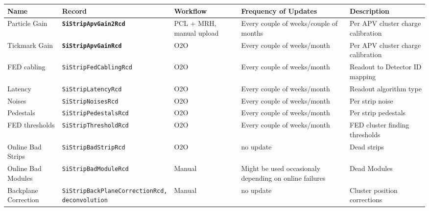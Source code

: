 \begin{table}[h!]
    \centering
    \begin{adjustbox}{max width=\textwidth}
    \begin{tabular}{p{3.4cm}|p{4.6cm}|p{2.5cm}|p{2.5cm}|p{3.5cm}}
        \textbf{Name} & \textbf{Record} & \textbf{Workflow} & \textbf{Frequency of Updates} & \textbf{Description} \\ \hline
      Particle Gain              & \texttt{\textbf{SiStripApvGain2Rcd}}             &   PCL + MRH, manual upload              & Every couple of weeks/couple of months  & Per APV cluster charge calibration  \\ \hline
      Tickmark Gain              & \texttt{\textbf{SiStripApvGainRcd}}              &   O2O                                   & Every couple of weeks/month             & Per APV cluster charge calibration  \\ \hline
      FED cabling                & \texttt{SiStripFedCablingRcd}           &   O2O                                   & Every couple of weeks/month             & Readout to Detector ID mapping  \\ \hline
      Latency                    & \texttt{SiStripLatencyRcd}              &   O2O                                   & Every couple of weeks/month             & Readout algorithm type  \\ \hline     
      Noises                     & \texttt{SiStripNoisesRcd}               &   O2O                                   & Every couple of weeks/month             & Per strip noise  \\ \hline
      Pedestals                  & \texttt{SiStripPedestalsRcd}            &   O2O                                   & Every couple of weeks/month             & Per strip pedestals  \\ \hline
      FED thresholds             & \texttt{SiStripThresholdRcd}            &   O2O                                   & Every couple of weeks/month             & FED cluster finding thresholds  \\ \hline
      Online Bad Strips          & \texttt{SiStripBadStripRcd}             &   O2O                                   & no update                               & Dead strips  \\ \hline  
      Online Bad Modules         & \texttt{SiStripBadModuleRcd}            &   Manual                                & Might be used occasionaly depending on online failures & Dead Modules  \\ \hline   
      Backplane Correction       & \parbox[t]{5cm}{\texttt{SiStripBackPlaneCorrectionRcd,}\\\texttt{deconvolution}}  &   Manual                   & no update                               & Cluster position corrections  \\ \hline      

\end{tabular}
\end{adjustbox}
\end{table}
